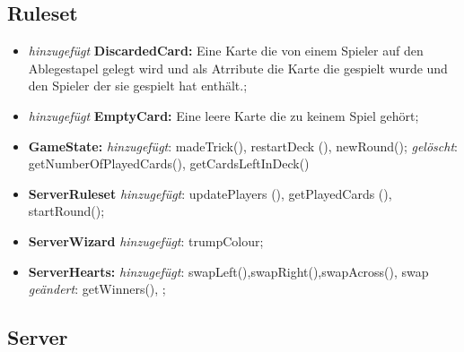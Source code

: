 \documentclass{article}
\begin{document}
\subsection{Ruleset}

\begin{itemize}
\item \textit{hinzugefügt} \textbf{DiscardedCard:} Eine Karte die von einem Spieler auf den Ablegestapel gelegt wird und als Atrribute die Karte die gespielt wurde und den Spieler der sie gespielt hat 
enthält.;

\item \textit{hinzugefügt} \textbf{EmptyCard:} Eine leere Karte die zu keinem Spiel gehört;

\item \textbf{GameState:} \textit{hinzugefügt}: madeTrick(), restartDeck (), newRound(); \textit{gelöscht}: getNumberOfPlayedCards(), getCardsLeftInDeck()

\item \textbf{ServerRuleset} \textit{hinzugefügt}: updatePlayers (), getPlayedCards (), startRound(); 

\item \textbf{ServerWizard} \textit{hinzugefügt}: trumpColour; 

\item \textbf{ServerHearts:} \textit{hinzugefügt}: swapLeft(),swapRight(),swapAcross(), swap
\textit{geändert}: getWinners(),  ;
\end{itemize}

\subsection{Server}
\end{document}
